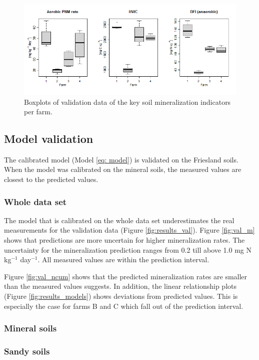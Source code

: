 \documentclass[10pt,twoside,dutch,english]{report}
\begin{document}
	\begin{figure}[ht] %
		\centering
		\includegraphics[width=1\linewidth]{results_valbox}
		\caption{Boxplots of validation data of the key soil mineralization indicators per farm.}
		\label{fig:results_valbox}
	\end{figure}

\subsection{Model validation}
The calibrated model (Model \ref{eq: model}) is validated on the Friesland soils. When the model was calibrated on the mineral soils, the measured values are closest to the predicted values. 

\subsubsection{Whole data set}
The model that is calibrated on the whole data set underestimates the real measurements for the validation data (Figure \ref{fig:results_val}).  
Figure \ref{fig:val_m} shows that predictions are more uncertain for higher mineralization rates. The uncertainty for the mineralization prediction ranges from 0.2 till above 1.0 mg N kg$^{-1}$ day$^{-1}$.   All measured values are within the prediction interval. 

Figure \ref{fig:val_ncum} shows that the predicted mineralization rates are smaller than the measured values suggests.  
In addition, the linear relationship plots (Figure \ref{fig:results_models}) shows deviations from predicted values. This is especially the case for  farms B and C which fall out of the prediction interval. 

\subsubsection{Mineral soils}
\subsubsection{Sandy soils}
\end{document}

